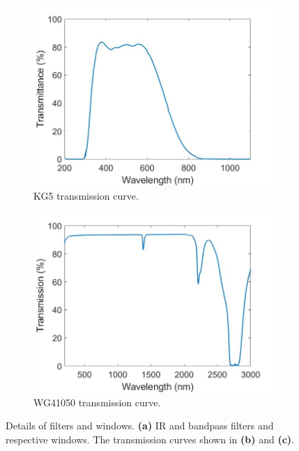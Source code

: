 \begin{figure} [h]
        \begin{subfigure}{.48\textwidth}
            \centering
            \includegraphics[width=\textwidth]{pictures/KG5_trans.jpg}
            \caption{KG5 transmission curve.}
        \end{subfigure}
      \hfill
        \begin{subfigure}{.48\textwidth}
            \centering
            \includegraphics[width=\textwidth]{pictures/UVFS_trans.jpg}
            \caption{WG41050 transmission curve.}
        \end{subfigure}
    
    \caption{Details of filters and windows. \textbf{(a)} IR and bandpass filters and respective windows. The transmission curves shown in \textbf{(b)} and \textbf{(c)}.}
    \label{fig:expsetup:windows}
\end{figure}


